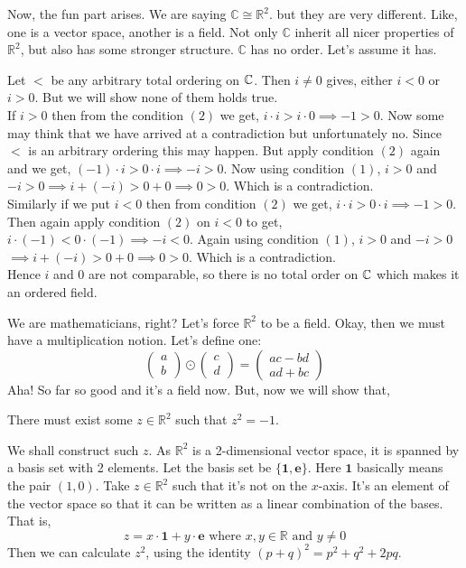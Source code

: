 Now, the fun part arises. We are saying $\mathbb{C}\cong\mathbb{R}^2$. but they are very different. Like, one is a vector space, another is a field. Not only $\mathbb{C}$ inherit all nicer properties of $\mathbb{R}^2$, but also has some stronger structure. $\mathbb{C}$ has no order. Let's assume it has.
\begin{tcolorbox}
Let $<$ be any arbitrary total ordering on $\Bbb{C}$. Then $i\neq 0$ gives, either $i<0$ or $i>0$. But we will show none of them holds true.\\
If $i>0$ then from the condition 
$(2)$ we get, $i\cdot i>i
\cdot0\implies -1>0$. Now some may think that we have arrived at a contradiction but unfortunately no. Since $<$ is an arbitrary ordering this may happen. But apply condition $(2)$ again and we get, $(-1)\cdot i>0\cdot i\implies -i>0$. Now using condition $(1)$, $i>0$ and $-i>0\implies i+(-i)>0+0\implies 0>0$. Which is a contradiction.\\ 
Similarly if we put $i<0$ then from condition $(2)$ we get, $i\cdot i>0\cdot i\implies -1>0$. Then again apply condition $(2)$ on $i<0$ to get, $i\cdot (-1)<0\cdot (-1)\implies -i<0$. Again using condition $(1)$, $i>0$ and $-i>0$ $\implies i+(-i)>0+0\implies 0>0$. Which is a contradiction.\\
Hence $i$ and $0$ are not comparable, so there is no total order on $\Bbb{C}$ which makes it an ordered field.
\end{tcolorbox}

We are mathematicians, right? Let's force $\mathbb{R}^2$ to be a field. Okay, then we must have a multiplication notion. Let's define one:
$$\begin{pmatrix}
    a\\b
\end{pmatrix}\odot\begin{pmatrix}
    c\\d
\end{pmatrix}=\begin{pmatrix}
    ac-bd\\ad+bc
\end{pmatrix}$$
Aha! So far so good and it's a field now. But, now we will show that, 
\begin{theorem}
There must exist some $z\in\mathbb{R}^2$ such that $z^2=-1$.
\end{theorem}
\proof We shall construct such $z$. As $\mathbb{R}^2$ is a 2-dimensional vector space, it is spanned by a basis set with 2 elements. Let the basis set be $\{\mathbf{1}, \mathbf{e}\}$. Here $\mathbf{1}$ basically means the pair $(1,0)$. Take $z \in \mathbb{R}^2$ such that it's not on the $x$-axis. It's an element of the vector space so that it can be written as a linear combination of the bases. That is,
$$
z=x \cdot \mathbf{1}+y \cdot \mathbf{e} \text { where } x, y \in \mathbb{R} \text { and } y \neq 0
$$
Then we can calculate $z^2$, using the identity $(p+q)^2=p^2+q^2+2 p q$.

